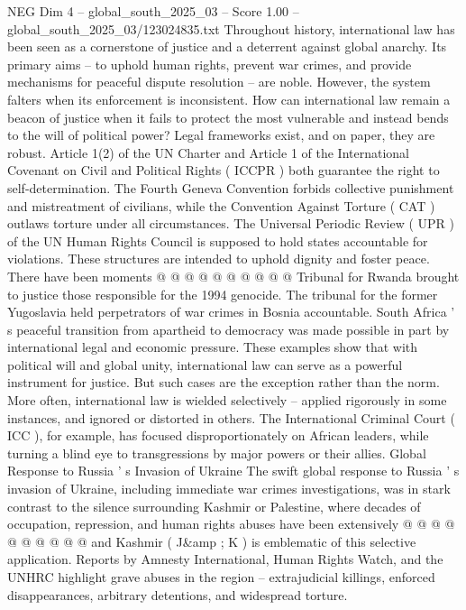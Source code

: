 \begin{textsample}{NEG Dim 4 – global\_south\_2025\_03 – Score 1.00 – global\_south\_2025\_03/123024835.txt}  \label{ex:f4_neg_421}
Throughout history, international law has been seen as a cornerstone of justice and a deterrent against global anarchy.
Its primary aims -- to uphold human rights, prevent war crimes, and provide mechanisms for peaceful dispute resolution -- are noble.
However, the system falters when its enforcement is inconsistent.
How can international law remain a beacon of justice when it fails to protect the most vulnerable and instead bends to the will of political power?
Legal frameworks exist, and on paper, they are robust.
Article 1(2) of the UN Charter and Article 1 of the International Covenant on Civil and Political Rights ( ICCPR ) both guarantee the right to self-determination.
The Fourth Geneva Convention forbids collective punishment and mistreatment of civilians, while the Convention Against Torture ( CAT ) outlaws torture under all circumstances.
The Universal Periodic Review ( UPR ) of the UN Human Rights Council is supposed to hold states accountable for violations.
These structures are intended to uphold dignity and foster peace.
There have been moments @ @ @ @ @ @ @ @ @ @ Tribunal for Rwanda brought to justice those responsible for the 1994 genocide.
The tribunal for the former Yugoslavia held perpetrators of war crimes in Bosnia accountable.
South Africa ' s peaceful transition from apartheid to democracy was made possible in part by international legal and economic pressure.
These examples show that with political will and global unity, international law can serve as a powerful instrument for justice.
But such cases are the exception rather than the norm.
More often, international law is wielded selectively -- applied rigorously in some instances, and ignored or distorted in others.
The International Criminal Court ( ICC ), for example, has focused disproportionately on African leaders, while turning a blind eye to transgressions by major powers or their allies.
Global Response to Russia ' s Invasion of Ukraine The swift global response to Russia ' s invasion of Ukraine, including immediate war crimes investigations, was in stark contrast to the silence surrounding Kashmir or Palestine, where decades of occupation, repression, and human rights abuses have been extensively @ @ @ @ @ @ @ @ @ @ and Kashmir ( J\&amp ; K ) is emblematic of this selective application.
Reports by Amnesty International, Human Rights Watch, and the UNHRC highlight grave abuses in the region -- extrajudicial killings, enforced disappearances, arbitrary detentions, and widespread torture.

\end{textsample}
